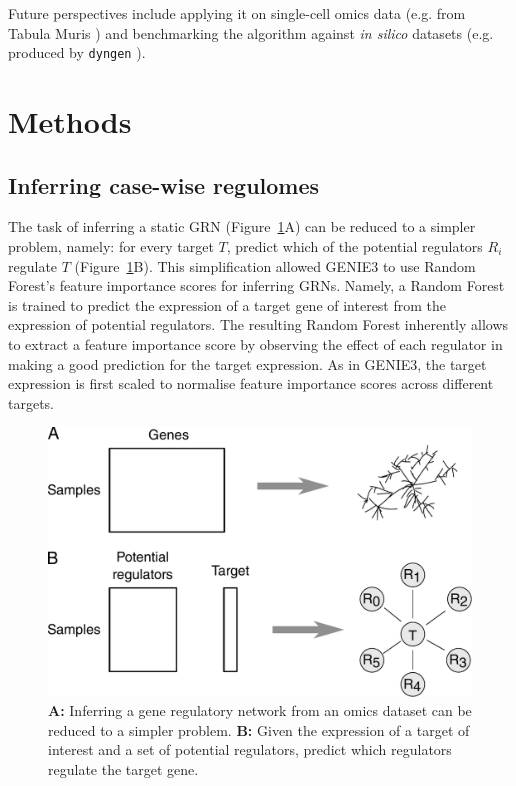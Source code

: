Future perspectives include applying it on single-cell omics data (e.g. from Tabula Muris \cite{schaum_singlecelltranscriptomics20_2018}) and benchmarking the algorithm against \textit{in silico} datasets (e.g. produced by \texttt{dyngen} \cite{cannoodt_dyngenbenchmarkingsilico_2019}).

\section{Methods}

\subsection{Inferring case-wise regulomes}
The task of inferring a static GRN (Figure~\ref{fig:simplify}A) can be reduced to a simpler problem, namely: for every target $T$, predict which of the potential regulators $R_i$ regulate $T$ (Figure~\ref{fig:simplify}B). This simplification allowed GENIE3 \cite{huynh-thu_inferringregulatorynetworks_2010} to use Random Forest's \cite{breiman_randomforests_2001} feature importance scores for inferring GRNs. Namely, a Random Forest is trained to predict the expression of a target gene of interest from the expression of potential regulators. The resulting Random Forest inherently allows to extract a feature importance score by observing the effect of each regulator in making a good prediction for the target expression. As in GENIE3, the target expression is first scaled to normalise feature importance scores across different targets.

\begin{figure}[htb!]
	\centering
	\includegraphics[width=.6\linewidth]{fig/methodology/simplify.pdf} 
	\caption{
		\textbf{A:} Inferring a gene regulatory network from an omics dataset can be reduced to a simpler problem. 
		\textbf{B:} Given the expression of a target of interest and a set of potential regulators, predict which regulators regulate the target gene.
	}
	\label{fig:simplify}
\end{figure}

